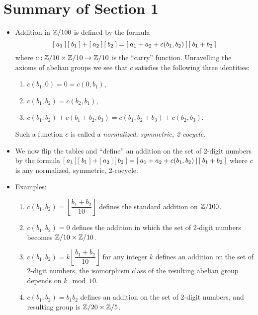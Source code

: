 \section*{Summary of Section 1}
\begin{itemize}
  \item Addition in $\mathbb{Z}/100$ is defined by the formula
  \begin{equation*}
    \left[\: a_1 \:\right]\left[\: b_1 \:\right] + \left[\: a_2 \:\right]\left[\: b_2 \:\right]
    =
    \left[\: a_1 + a_2 + c(b_1, b_2) \:\right]\left[\: b_1 + b_2 \:\right]
  \end{equation*}
  where $c: \mathbb{Z}/10 \times \mathbb{Z}/10 \rightarrow \mathbb{Z}/10$ is the ``carry'' function.
  Unravelling the axioms of abelian groups we see that $c$ satisfies the following three identities:
  \begin{enumerate}
    \item $c(b_1, 0) = 0 = c(0,b_1)$,
    \item $c(b_1, b_2) = c(b_2, b_1)$,
    \item $c(b_1, b_2) + c(b_1 + b_2, b_3) = c(b_1 , b_2 + b_3) + c(b_2, b_3)$.
  \end{enumerate}
  Such a function $c$ is called a \emph{normalized, symmetric, 2-cocycle}.

  \item We now flip the tables and ``define'' an addition on the set of 2-digit numbers by the formula $\left[\: a_1 \:\right]\left[\: b_1 \:\right] + \left[\: a_2 \:\right]\left[\: b_2 \:\right]
  =
  \left[\: a_1 + a_2 + c(b_1, b_2) \:\right]\left[\: b_1 + b_2 \:\right]$ where $c$ is any normalized, symmetric, 2-cocycle.

  \item Examples:
    \begin{enumerate}
      \item $c(b_1, b_2) = \left \lfloor \dfrac{b_1 + b_2}{10}  \right \rfloor $ defines the standard addition on $\mathbb{Z}/100$.
      \item $c(b_1, b_2) = 0$ defines the addition in which the set of 2-digit numbers becomes $\mathbb{Z}/10 \times \mathbb{Z}/10$.
      \item $c(b_1, b_2) = k\left \lfloor \dfrac{b_1 + b_2}{10}  \right \rfloor$ for any integer $k$ defines an addition on the set of 2-digit numbers, the isomorphism class of the resulting abelian group depends on $k \mod 10$.
      \item $c(b_1, b_2) = b_1 b_2$ defines an addition on the set of 2-digit numbers, and resulting group is $\mathbb{Z}/20 \times \mathbb{Z}/5$.
    \end{enumerate}
\end{itemize}


